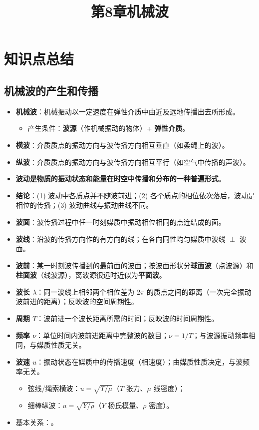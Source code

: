 \documentclass[12pt,a4paper]{ctexart}
\title{第8章\quad 机械波}
\author{}
\date{}
\begin{document}
\maketitle

\section{知识点总结}

\subsection{机械波的产生和传播}

\begin{itemize}
    \item \textbf{机械波}：机械振动以一定速度在弹性介质中由近及远地传播出去所形成。
    \begin{itemize}
        \item 产生条件：\textbf{波源}（作机械振动的物体）+ \textbf{弹性介质}。
    \end{itemize}
    \item \textbf{横波}：介质质点的振动方向与波传播方向相互垂直（如柔绳上的波）。
    \item \textbf{纵波}：介质质点的振动方向与波传播方向相互平行（如空气中传播的声波）。
    \item \textbf{波动是物质的振动状态和能量在时空中传播和分布的一种普遍形式}。
    \item \textbf{结论}：(1) 波动中各质点并不随波前进；(2) 各个质点的相位依次落后，波动是相位的传播；(3) 波动曲线与振动曲线不同。
    \item \textbf{波面}：波传播过程中任一时刻媒质中振动相位相同的点连结成的面。
    \item \textbf{波线}：沿波的传播方向作的有方向的线；在各向同性均匀媒质中波线 $\perp$ 波面。
    \item \textbf{波前}：某一时刻波传播到的最前面的波面；按波面形状分\textbf{球面波}（点波源）和\textbf{柱面波}（线波源），离波源很远时近似为\textbf{平面波}。
    \item \textbf{波长 $\lambda$}：同一波线上相邻两个相位差为 $2\pi$ 的质点之间的距离（一次完全振动波前进的距离）；反映波的空间周期性。
    \item \textbf{周期 $T$}：波前进一个波长距离所需的时间；反映波的时间周期性。
    \item \textbf{频率 $\nu$}：单位时间内波前进距离中完整波的数目；$\nu = 1/T$；与波源振动频率相同，与媒质性质无关。
    \item \textbf{波速 $u$}：振动状态在媒质中的传播速度（相速度）；由媒质性质决定，与波频率无关。
    \begin{itemize}
        \item 弦线/绳索横波：$u = \sqrt{T/\mu}$（$T$ 张力、$\mu$ 线密度）；
        \item 细棒纵波：$u = \sqrt{Y/\rho}$（$Y$ 杨氏模量、$\rho$ 密度）。
    \end{itemize}
    \item 基本关系：。
\end{itemize}
\end{document}
